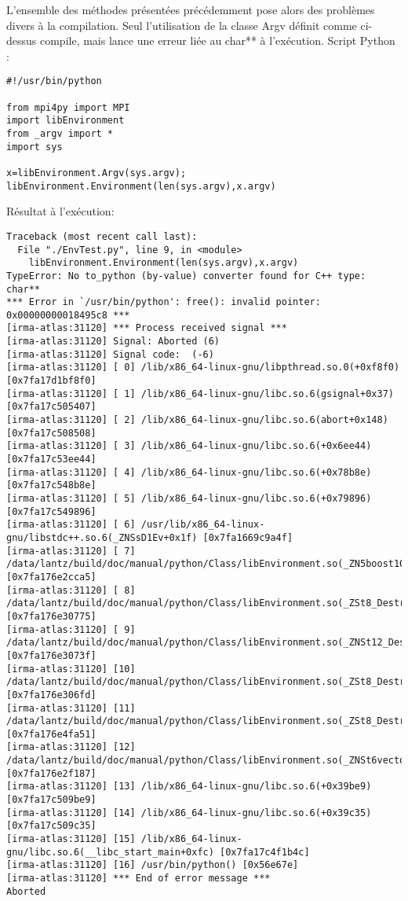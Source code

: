 \documentclass[12pt]{article}
\begin{document}
L'ensemble des méthodes présentées précédemment pose alors des problèmes divers à la compilation. Seul l'utilisation de la classe Argv définit comme ci-dessus compile, mais lance une erreur liée au char**  à l'exécution.
\newline
Script Python :
\begin{lstlisting}
#!/usr/bin/python

from mpi4py import MPI
import libEnvironment
from _argv import *
import sys

x=libEnvironment.Argv(sys.argv);
libEnvironment.Environment(len(sys.argv),x.argv)
\end{lstlisting}

Résultat à l'exécution:
\begin{lstlisting}
Traceback (most recent call last):
  File "./EnvTest.py", line 9, in <module>
    libEnvironment.Environment(len(sys.argv),x.argv)
TypeError: No to_python (by-value) converter found for C++ type: char**
*** Error in `/usr/bin/python': free(): invalid pointer: 0x00000000018495c8 ***
[irma-atlas:31120] *** Process received signal ***
[irma-atlas:31120] Signal: Aborted (6)
[irma-atlas:31120] Signal code:  (-6)
[irma-atlas:31120] [ 0] /lib/x86_64-linux-gnu/libpthread.so.0(+0xf8f0) [0x7fa17d1bf8f0]
[irma-atlas:31120] [ 1] /lib/x86_64-linux-gnu/libc.so.6(gsignal+0x37) [0x7fa17c505407]
[irma-atlas:31120] [ 2] /lib/x86_64-linux-gnu/libc.so.6(abort+0x148) [0x7fa17c508508]
[irma-atlas:31120] [ 3] /lib/x86_64-linux-gnu/libc.so.6(+0x6ee44) [0x7fa17c53ee44]
[irma-atlas:31120] [ 4] /lib/x86_64-linux-gnu/libc.so.6(+0x78b8e) [0x7fa17c548b8e]
[irma-atlas:31120] [ 5] /lib/x86_64-linux-gnu/libc.so.6(+0x79896) [0x7fa17c549896]
[irma-atlas:31120] [ 6] /usr/lib/x86_64-linux-gnu/libstdc++.so.6(_ZNSsD1Ev+0x1f) [0x7fa1669c9a4f]
[irma-atlas:31120] [ 7] /data/lantz/build/doc/manual/python/Class/libEnvironment.so(_ZN5boost10filesystem4pathD2Ev+0x15) [0x7fa176e2cca5]
[irma-atlas:31120] [ 8] /data/lantz/build/doc/manual/python/Class/libEnvironment.so(_ZSt8_DestroyIN5boost10filesystem4pathEEvPT_+0x15) [0x7fa176e30775]
[irma-atlas:31120] [ 9] /data/lantz/build/doc/manual/python/Class/libEnvironment.so(_ZNSt12_Destroy_auxILb0EE9__destroyIPN5boost10filesystem4pathEEEvT_S6_+0x2f) [0x7fa176e3073f]
[irma-atlas:31120] [10] /data/lantz/build/doc/manual/python/Class/libEnvironment.so(_ZSt8_DestroyIPN5boost10filesystem4pathEEvT_S4_+0x1d) [0x7fa176e306fd]
[irma-atlas:31120] [11] /data/lantz/build/doc/manual/python/Class/libEnvironment.so(_ZSt8_DestroyIPN5boost10filesystem4pathES2_EvT_S4_RSaIT0_E+0x21) [0x7fa176e4fa51]
[irma-atlas:31120] [12] /data/lantz/build/doc/manual/python/Class/libEnvironment.so(_ZNSt6vectorIN5boost10filesystem4pathESaIS2_EED2Ev+0x37) [0x7fa176e2f187]
[irma-atlas:31120] [13] /lib/x86_64-linux-gnu/libc.so.6(+0x39be9) [0x7fa17c509be9]
[irma-atlas:31120] [14] /lib/x86_64-linux-gnu/libc.so.6(+0x39c35) [0x7fa17c509c35]
[irma-atlas:31120] [15] /lib/x86_64-linux-gnu/libc.so.6(__libc_start_main+0xfc) [0x7fa17c4f1b4c]
[irma-atlas:31120] [16] /usr/bin/python() [0x56e67e]
[irma-atlas:31120] *** End of error message ***
Aborted
\end{lstlisting}
\end{document}
